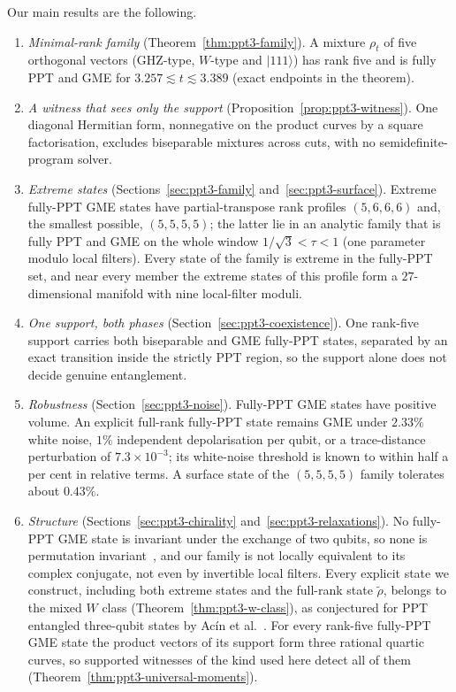 \documentclass[11pt]{article}
\theoremstyle{remark}
\newcommand{\ket}[1]{\lvert#1\rangle}
\begin{document}
Our main results are the following.
\begin{enumerate}[label=(\arabic*),itemsep=0pt,topsep=2pt]
\item \emph{Minimal-rank family} (Theorem~\ref{thm:ppt3-family}). A mixture $\rho_t$ of five orthogonal
vectors (GHZ-type, $W$-type and $\ket{111}$) has rank five and is fully PPT and GME for $3.257\lesssim t\lesssim3.389$ (exact endpoints in the
theorem).
\item \emph{A witness that sees only the support} (Proposition~\ref{prop:ppt3-witness}). One diagonal Hermitian form,
nonnegative on the product curves by a square factorisation, excludes biseparable mixtures across cuts, with no
semidefinite-program solver.
\item \emph{Extreme states} (Sections~\ref{sec:ppt3-family} and~\ref{sec:ppt3-surface}). Extreme fully-PPT GME states have
partial-transpose rank profiles $(5,6,6,6)$ and, the smallest possible, $(5,5,5,5)$; the latter lie in an analytic family
that is fully PPT and GME on the whole window $1/\sqrt3<\tau<1$ (one parameter modulo local filters). Every state of the family is
extreme in the fully-PPT set, and near every member the extreme states of this profile form a $27$-dimensional manifold with
nine local-filter moduli.
\item \emph{One support, both phases} (Section~\ref{sec:ppt3-coexistence}). One rank-five support carries both
biseparable and GME fully-PPT states, separated by an exact transition inside the strictly PPT region, so the support alone
does not decide genuine entanglement.
\item \emph{Robustness} (Section~\ref{sec:ppt3-noise}). Fully-PPT GME states have positive volume. An explicit full-rank
fully-PPT state remains GME under $2.33\%$ white noise, $1\%$ independent depolarisation per qubit, or a trace-distance
perturbation of $7.3\times10^{-3}$; its white-noise threshold is known to within half a per cent in relative terms. A
surface state of the $(5,5,5,5)$ family tolerates about $0.43\%$.
\item \emph{Structure} (Sections~\ref{sec:ppt3-chirality} and~\ref{sec:ppt3-relaxations}). No fully-PPT GME state is invariant
under the exchange of two qubits, so none is permutation invariant~\cite{NMG}, and our family is not locally equivalent
to its complex conjugate, not even by invertible local filters. Every explicit state we construct, including both extreme states
and the full-rank state $\tilde\rho$, belongs to the mixed $W$ class (Theorem~\ref{thm:ppt3-w-class}), as conjectured for PPT entangled three-qubit states by Ac\'in et al.~\cite{ABLS}. For every rank-five fully-PPT GME state the product vectors of its support form three rational
quartic curves, so supported witnesses of the kind used here detect all of them
(Theorem~\ref{thm:ppt3-universal-moments}).
\end{enumerate}
\end{document}
